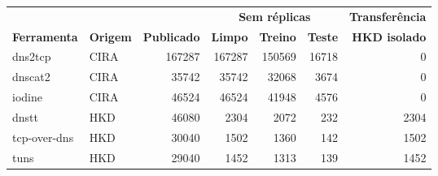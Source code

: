 \begin{tabular}{llrrrrr}
\hline
\multicolumn{2}{c}{\textbf{}} & \multicolumn{1}{c}{\textbf{}} & \multicolumn{3}{c}{\textbf{Sem réplicas}} & \multicolumn{1}{c}{\textbf{Transferência}} \\
\textbf{Ferramenta} & \textbf{Origem} & \textbf{Publicado} & \textbf{Limpo} & \textbf{Treino} & \textbf{Teste} & \textbf{HKD isolado} \\ \hline
dns2tcp & CIRA & 167287 & 167287 & 150569 & 16718 & 0 \\
dnscat2 & CIRA & 35742 & 35742 & 32068 & 3674 & 0 \\
iodine & CIRA & 46524 & 46524 & 41948 & 4576 & 0 \\
dnstt & HKD & 46080 & 2304 & 2072 & 232 & 2304 \\
tcp-over-dns & HKD & 30040 & 1502 & 1360 & 142 & 1502 \\
tuns & HKD & 29040 & 1452 & 1313 & 139 & 1452 \\
\hline
\end{tabular}
